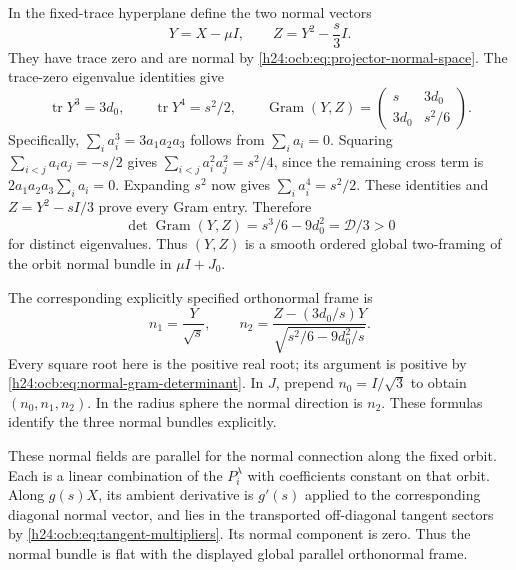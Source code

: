 In the fixed-trace hyperplane define the two normal vectors
\begin{equation}
 Y=X-\mu I,\qquad Z=Y^2-\frac{s}{3}I.
 \label{h24:ocb:eq:two-normal-fields}\tag{OCB23}
\end{equation}
They have trace zero and are normal by
\eqref{h24:ocb:eq:projector-normal-space}. The trace-zero eigenvalue
identities give
\begin{equation}
 \operatorname{tr}Y^3=3d_0,\qquad
 \operatorname{tr}Y^4=s^2/2,\qquad
 \operatorname{Gram}(Y,Z)=
 \begin{pmatrix}s&3d_0\\3d_0&s^2/6\end{pmatrix}.
 \label{h24:ocb:eq:normal-gram}\tag{OCB24}
\end{equation}
Specifically, $\sum_i a_i^3=3a_1a_2a_3$ follows from
$\sum_i a_i=0$. Squaring $\sum_{i<j}a_ia_j=-s/2$ gives
$\sum_{i<j}a_i^2a_j^2=s^2/4$, since the remaining cross term is
$2a_1a_2a_3\sum_i a_i=0$. Expanding $s^2$ now gives
$\sum_i a_i^4=s^2/2$. These identities and
$Z=Y^2-sI/3$ prove every Gram entry. Therefore
\begin{equation}
 \det\operatorname{Gram}(Y,Z)=s^3/6-9d_0^2
                             =\mathcal D/3>0
 \label{h24:ocb:eq:normal-gram-determinant}\tag{OCB25}
\end{equation}
for distinct eigenvalues. Thus $(Y,Z)$ is a smooth ordered global
two-framing of the orbit normal bundle in $\mu I+J_0$.

The corresponding explicitly specified orthonormal frame is
\begin{equation}
 n_1=\frac{Y}{\sqrt s},\qquad
 n_2=\frac{Z-(3d_0/s)Y}{\sqrt{s^2/6-9d_0^2/s}}.
 \label{h24:ocb:eq:orthonormal-frame}\tag{OCB26}
\end{equation}
Every square root here is the positive real root; its argument is
positive by \eqref{h24:ocb:eq:normal-gram-determinant}. In $J$, prepend
$n_0=I/\sqrt3$ to obtain $(n_0,n_1,n_2)$. In the radius sphere the
normal direction is $n_2$. These formulas identify the three normal
bundles explicitly.

These normal fields are parallel for the normal connection along the
fixed orbit. Each is a linear combination of the $P_i^\lambda$ with
coefficients constant on that orbit. Along $g(s)X$, its ambient
derivative is $g'(s)$ applied to the corresponding diagonal normal
vector, and lies in the transported off-diagonal tangent sectors by
\eqref{h24:ocb:eq:tangent-multipliers}. Its normal component is zero.
Thus the normal bundle is flat with the displayed global parallel
orthonormal frame.

